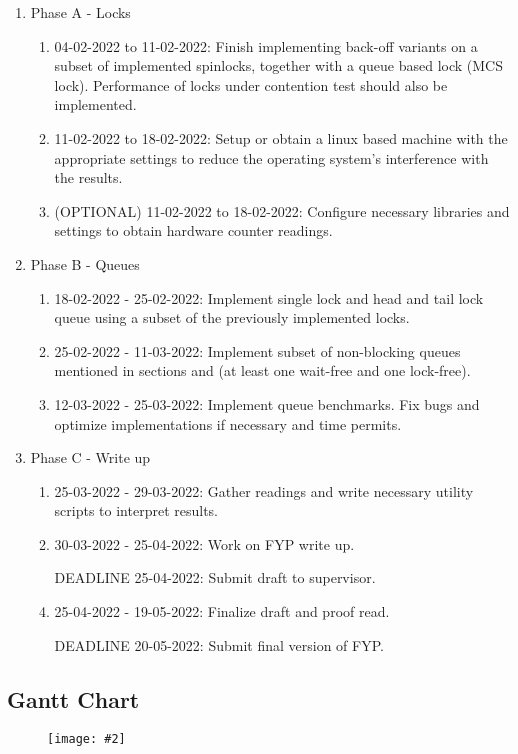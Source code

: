 \documentclass[a4paper, 12pt, titlepage]{article}
\newcommand{\image}[4]{
  \begin{figure}[H]
    \centerline{\texttt{[image: \#2]}}
    \captionof{figure}{#3}
    \label{fig: #4}
  \end{figure}
}
\begin{document}
\begin{singlespace}
\begin{enumerate}
  \item Phase A - Locks
  \begin{enumerate}
    \item 04-02-2022 to 11-02-2022: Finish implementing back-off variants on a subset of implemented spinlocks, together with a queue based lock (MCS lock). Performance of locks under contention test should also be implemented.
    \item 11-02-2022 to 18-02-2022: Setup or obtain a linux based machine with the appropriate settings to reduce the operating system's interference with the results.
  \item (OPTIONAL) 11-02-2022 to 18-02-2022: Configure necessary libraries and settings to obtain hardware counter readings.
  \end{enumerate}
  \item Phase B - Queues
  \begin{enumerate}
    \item 18-02-2022 - 25-02-2022: Implement single lock and head and tail lock queue using a subset of the previously implemented locks.
    \item 25-02-2022 - 11-03-2022: Implement subset of non-blocking queues mentioned in sections  and  (at least one wait-free and one lock-free).
    \item 12-03-2022 - 25-03-2022: Implement queue benchmarks. Fix bugs and optimize implementations if necessary and time permits.
  \end{enumerate}
  \item Phase C - Write up
  \begin{enumerate}
    \item 25-03-2022 - 29-03-2022: Gather readings and write necessary utility scripts to interpret results.
    \item 30-03-2022 - 25-04-2022: Work on FYP write up.
    \item [DEADLINE]25-04-2022: Submit draft to supervisor.
    \item 25-04-2022 - 19-05-2022: Finalize draft and proof read.
  \item [DEADLINE]20-05-2022: Submit final version of FYP.
  \end{enumerate}
\end{enumerate}

\subsection{Gantt Chart}
\image{0.8}{gantt_chart.png}{Gantt chart}{gantt}


\end{singlespace}
\end{document}
